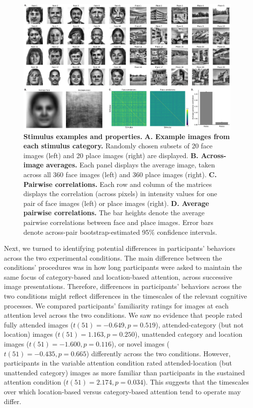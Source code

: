\documentclass[english]{article}
\begin{document}
\begin{figure}[tp]
	\centering
	\includegraphics[width=\textwidth]{figs/stimuli}
  
  \caption{\textbf{Stimulus examples and properties.} \textbf{A. Example images
  from each stimulus category.} Randomly chosen subsets of 20 face images
  (left) and 20 place images (right) are displayed. \textbf{B. Across-image
  averages.} Each panel displays the average image, taken across all 360 face
  images (left) and 360 place images (right). \textbf{C. Pairwise
  correlations.} Each row and column of the matrices displays the correlation
  (across pixels) in intensity values for one pair of face images (left) or
  place images (right). \textbf{D. Average pairwise correlations.} The bar
  heights denote the average pairwise correlations between face and place
  images. Error bars denote across-pair bootstrap-estimated 95\%
  confidence intervals.}
  
  \label{fig:stimuli}
  \end{figure}

Next, we turned to identifying potential differences in participants' behaviors
across the two experimental conditions. The main difference between the
conditions' procedures was in how long participants were asked to maintain the
same focus of category-based and location-based attention, across successive
image presentations. Therefore, differences in participants' behaviors across
the two conditions might reflect differences in the timescales of the relevant
cognitive processes. We compared participants' familiarity ratings for images
at each attention level across the two conditions. We saw no evidence that
people rated fully attended images ($t(51) = -0.649, p = 0.519$),
attended-category (but not location) images ($t(51) = 1.163, p = 0.250$),
unattended category and location images ($t(51) = -1.600, p = 0.116$), or novel
images ($t(51) = -0.435, p = 0.665$) differently across the two conditions.
However, participants in the variable attention condition rated
attended-location (but unattended category) images as more familiar than
participants in the sustained attention condition ($t(51) = 2.174, p = 0.034$).
This suggests that the timescales over which location-based versus
category-based attention tend to operate may differ.
\end{document}
